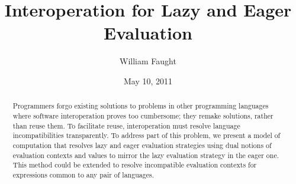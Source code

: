 \documentclass[12pt]{article}
\begin{document}
\title{Interoperation for Lazy and Eager Evaluation}
\author{William Faught}
\date{May 10, 2011}
\maketitle

\begin{abstract}
Programmers forgo existing solutions to problems in other programming languages where software interoperation proves too cumbersome; they remake solutions, rather than reuse them. To facilitate reuse, interoperation must resolve language incompatibilities transparently. To address part of this problem, we present a model of computation that resolves lazy and eager evaluation strategies using dual notions of evaluation contexts and values to mirror the lazy evaluation strategy in the eager one. This method could be extended to resolve incompatible evaluation contexts for expressions common to any pair of languages.
\end{abstract}






\clearpage



\end{document}
